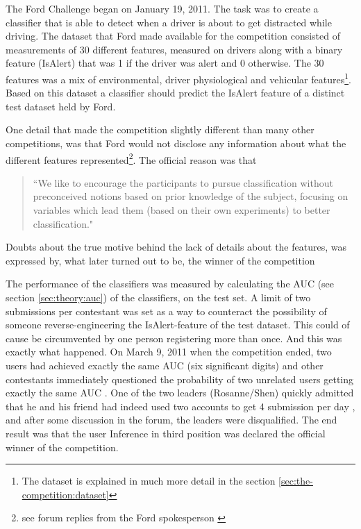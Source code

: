 The Ford Challenge began on January 19, 2011. The task was to create a classifier that is able to detect when a driver is about to get distracted while driving. The dataset that Ford made available for the competition consisted of measurements of 30 different features, measured on drivers along with a binary feature (IsAlert) that was 1 if the driver was alert and 0 otherwise. The 30 features was a mix of environmental, driver physiological and vehicular features\footnote{The dataset is explained in much more detail in the section \ref{sec:the-competition:dataset}}. Based on this dataset a classifier should predict the IsAlert feature of a distinct test dataset held by Ford. \par
One detail that made the competition slightly different than many other competitions, was that Ford would not disclose any information about what the different features represented\footnote{see forum replies from the Ford spokesperson \citep{kaggle_forum_266,kaggle_forum_317}}. The official reason was that \citep{kaggle_forum_268_reply_2}
\begin{quote}
    ``We like to encourage the participants to pursue classification without preconceived notions based on prior knowledge of the subject, focusing on variables which lead them (based on their own experiments) to better classification."
\end{quote}
Doubts about the true motive behind the lack of details about the features, was expressed by, what later turned out to be, the winner of the competition \citep{kaggle_forum_295_reply_3} \par

The performance of the classifiers was measured by calculating the AUC (see section \ref{sec:theory:auc}) of the classifiers, on the test set. A limit of two submissions per contestant was set as a way to counteract the possibility of someone reverse-engineering the IsAlert-feature of the test dataset. This could of cause be circumvented by one person registering more than once. And this was exactly what happened. On March 9, 2011 when the competition ended, two users had achieved exactly the same AUC (six significant digits) and other contestants immediately questioned the probability of two unrelated users getting exactly the same AUC \citep{kaggle_forum_327_reply_1}. One of the two leaders (Rosanne/Shen) quickly admitted that he and his friend had indeed used two accounts to get 4 submission per day \citep{kaggle_forum_327_reply_4}, and after some discussion in the forum, the leaders were disqualified. The end result was that the user Inference in third position was declared the official winner of the competition. \par

